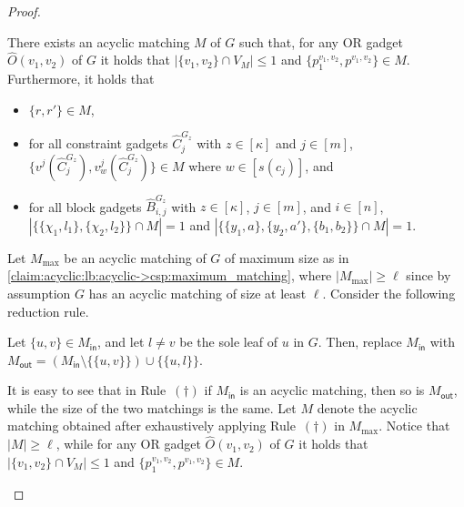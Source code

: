 \begin{proof}
\begin{nestedproof}
            \begin{claim}\label{claim:acyclic:lb:acyclic->csp:matching_properties}
                There exists an acyclic matching $M$ of $G$ such that,
                for any OR gadget $\hat{O}(v_1,v_2)$ of $G$ it holds that $|\{v_1,v_2\} \cap V_M| \le 1$ and $\{p^{v_1,v_2}_1,p^{v_1,v_2}\} \in M$.
                Furthermore, it holds that
                \begin{itemize}
                    \item $\{r,r'\} \in M$,

                    \item for all constraint gadgets $\hat{C}^{G_z}_j$ with $z \in [\kappa]$ and $j \in [m]$,
                    $\{v^j (\hat{C}^{G_z}_j),v^j_w (\hat{C}^{G_z}_j)\} \in M$ where $w \in [s(c_j)]$, and

                    \item for all block gadgets $\hat{B}^{G_z}_{i,j}$ with $z \in [\kappa]$, $j \in [m]$, and $i \in [n]$,
                    $| \{ \{\chi_1,l_1\}, \{\chi_2,l_2\} \} \cap M| = 1$ and $|\{\{ y_1, a \}, \{ y_2, a' \}, \{ b_1, b_2 \}\} \cap M| = 1$.
                \end{itemize}
            \end{claim}

            \begin{claimproof}
                Let $M_{\max}$ be an acyclic matching of $G$ of maximum size as in \cref{claim:acyclic:lb:acyclic->csp:maximum_matching},
                where $|M_{\max}| \ge \ell$ since by assumption $G$ has an acyclic matching of size at least $\ell$.
                Consider the following reduction rule.

                Let $\{u,v\} \in M_{\mathsf{in}}$, and let $l \neq v$ be the sole leaf of $u$ in $G$.
                Then, replace $M_{\mathsf{in}}$ with $M_{\mathsf{out}} = (M_{\mathsf{in}} \setminus \{\{u,v\}\}) \cup \{\{u,l\}\}$.

                It is easy to see that in Rule~$(\dagger)$ if $M_{\mathsf{in}}$ is an acyclic matching,
                then so is $M_{\mathsf{out}}$, while the size of the two matchings is the same.
                Let $M$ denote the acyclic matching obtained after exhaustively applying Rule~$(\dagger)$ in $M_{\max}$.
                Notice that $|M| \ge \ell$, while for any OR gadget $\hat{O}(v_1,v_2)$ of $G$ it holds that $|\{v_1,v_2\} \cap V_M| \le 1$
                and $\{p^{v_1,v_2}_1,p^{v_1,v_2}\} \in M$.


\end{claimproof}
\end{nestedproof}
\end{proof}

